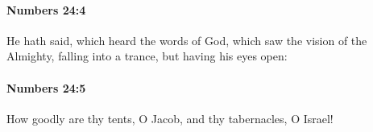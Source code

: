 		\paragraph{Numbers 24:4} %
			\label{NUMBERS-24-4}

			He hath said, which heard the words of God, which saw the vision of the Almighty, falling into a trance, but having his eyes open:


		\paragraph{Numbers 24:5} %
			\label{NUMBERS-24-5}

			How goodly are thy tents, O Jacob, and thy tabernacles, O Israel!


